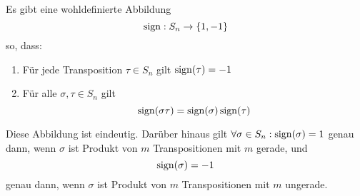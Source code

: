 \begin{subtheorem}
	Es gibt eine wohldefinierte Abbildung
	\[
		\operatorname{sign}: S_n \to \left\{ 1, -1 \right\} 
	\]
	so, dass:
	\begin{enumerate}[label=(\alph*)]
		\item Für jede Transposition $ \tau \in S_n $ gilt $ \operatorname{sign}(\tau) = -1 $ 
		\item Für alle $ \sigma, \tau \in S_n $ gilt
			\[
				\operatorname{sign}(\sigma \tau) = \operatorname{sign}(\sigma) \operatorname{sign}(\tau)
			\]
	\end{enumerate}
	Diese Abbildung ist eindeutig.
	Darüber hinaus gilt $ \forall  \sigma \in S_n : \operatorname{sign}(\sigma) = 1 $ genau dann, wenn $ \sigma $ ist Produkt von $ m $ Transpositionen mit $ m $ gerade, und
	\[
		\operatorname{sign}(\sigma) =  - 1
	\]
	genau dann, wenn $ \sigma  $ ist Produkt von $ m $ Transpositionen mit $ m $ ungerade.
\end{subtheorem}

